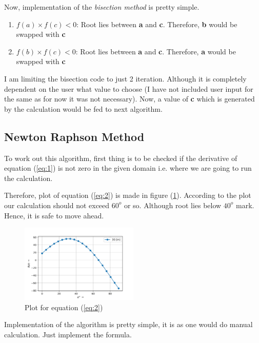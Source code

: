 \documentclass[11pt,a4paper]{article}
\begin{document}
Now, implementation of the \textit{bisection method} is pretty simple.

\begin{enumerate}
\item $f(a)\times f(c) < 0$: Root lies between \textbf{a} and \textbf{c}. Therefore, \textbf{b} would be swapped with \textbf{c}
\item $f(b)\times f(c) < 0$: Root lies between \textbf{a} and \textbf{c}. Therefore, \textbf{a} would be swapped with \textbf{c}
\end{enumerate} 
 
I am limiting the bisection code to just 2 iteration. Although it is completely dependent on the user what value to choose (I have not included user input for the same as for now it was not necessary). Now, a value of \textbf{c} which is generated by the calculation would be fed to next algorithm.

\subsection*{Newton Raphson Method} 

To work out this algorithm, first thing is to be checked if the derivative of equation (\ref{eq:1}) is not zero in the given domain i.e. where we are going to run the calculation.\medskip

Therefore, plot of equation (\ref{eq:2}) is made in figure (\ref{fig:3}). According to the plot our calculation should not exceed $60^o$ or so. Although root lies below $40^o$ mark. Hence, it is safe to move ahead.

	\begin{figure}[H]	
	\begin{center}
	\includegraphics[width=0.5\textwidth]{func_2.png}
	\caption{Plot for equation (\ref{eq:2})}
	\label{fig:3}	
	\end{center}
	\end{figure}

Implementation of the algorithm  is pretty simple, it is as one would do manual calculation. Just implement the formula.
\end{document}
